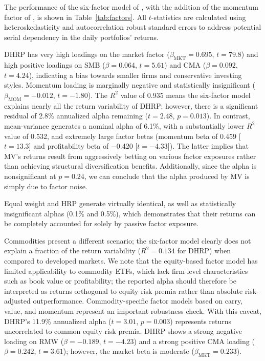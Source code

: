 The performance of the six-factor model of \citet{FamaFrench2015}, with the addition of the momentum factor of \citet{Carhart1997}, is shown in Table~\ref{tab:factors}. All $t$-statistics are calculated using \citet{NeweyWest1987} heteroskedasticity and autocorrelation robust standard errors to address potential serial dependency in the daily portfolios' returns.

DHRP has very high loadings on the market factor ($\beta_{\text{MKT}} = 0.695$, $t = 79.8$) and high positive loadings on SMB ($\beta = 0.064$, $t = 5.61$) and CMA ($\beta = 0.092$, $t = 4.24$), indicating a bias towards smaller firms and conservative investing styles. Momentum loading is marginally negative and statistically insignificant ($\beta_{\text{MOM}} = -0.012$, $t = -1.80$). The $R^2$ value of 0.935 means the six-factor model explains nearly all the return variability of DHRP; however, there is a significant residual of 2.8\% annualized alpha remaining ($t = 2.48$, $p = 0.013$). In contrast, mean-variance generates a nominal alpha of 6.1\%, with a substantially lower $R^2$ value of 0.532, and extremely large factor betas (momentum beta of 0.459 [$t = 13.3$] and profitability beta of $-$0.420 [$t = -4.33$]). The latter implies that MV's returns result from aggressively betting on various factor exposures rather than achieving structural diversification benefits. Additionally, since the alpha is nonsignificant at $p = 0.24$, we can conclude that the alpha produced by MV is simply due to factor noise.

Equal weight and HRP generate virtually identical, as well as statistically insignificant alphas (0.1\% and 0.5\%), which demonstrates that their returns can be completely accounted for solely by passive factor exposure.

Commodities present a different scenario; the six-factor model clearly does not explain a fraction of the return variability ($R^2 = 0.134$ for DHRP) when compared to developed markets. We note that the equity-based factor model has limited applicability to commodity ETFs, which lack firm-level characteristics such as book value or profitability; the reported alpha should therefore be interpreted as returns orthogonal to equity risk premia rather than absolute risk-adjusted outperformance. Commodity-specific factor models based on carry, value, and momentum \citep{AsnessMoskowitzPedersen2013} represent an important robustness check. With this caveat, DHRP's 11.9\% annualized alpha ($t = 3.01$, $p = 0.003$) represents returns uncorrelated to common equity risk premia. DHRP shows a strong negative loading on RMW ($\beta = -0.189$, $t = -4.23$) and a strong positive CMA loading ($\beta = 0.242$, $t = 3.61$); however, the market beta is moderate ($\beta_{\text{MKT}} = 0.233$).


